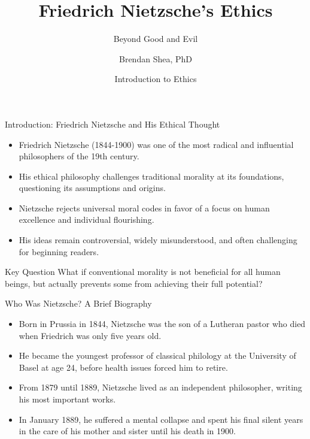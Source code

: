\documentclass{beamer}
\title{Friedrich Nietzsche's Ethics}
\subtitle{Beyond Good and Evil}
\author{Brendan Shea, PhD}
\date{Introduction to Ethics}
\begin{document}
\begin{frame}
\titlepage
\end{frame}

\begin{frame}{Introduction: Friedrich Nietzsche and His Ethical Thought}
\begin{itemize}
\item Friedrich Nietzsche (1844-1900) was one of the most radical and influential philosophers of the 19th century.
\item His ethical philosophy challenges traditional morality at its foundations, questioning its assumptions and origins.
\item Nietzsche rejects universal moral codes in favor of a focus on human excellence and individual flourishing.
\item His ideas remain controversial, widely misunderstood, and often challenging for beginning readers.
\end{itemize}

\begin{alertblock}{Key Question}
What if conventional morality is not beneficial for all human beings, but actually prevents some from achieving their full potential?
\end{alertblock}
\end{frame}

\begin{frame}{Who Was Nietzsche? A Brief Biography}
\begin{itemize}
\item Born in Prussia in 1844, Nietzsche was the son of a Lutheran pastor who died when Friedrich was only five years old.
\item He became the youngest professor of classical philology at the University of Basel at age 24, before health issues forced him to retire.
\item From 1879 until 1889, Nietzsche lived as an independent philosopher, writing his most important works.
\item In January 1889, he suffered a mental collapse and spent his final silent years in the care of his mother and sister until his death in 1900.
\end{itemize}

\begin{center}
\scriptsize
{}
\end{center}
\end{frame}
\end{document}
